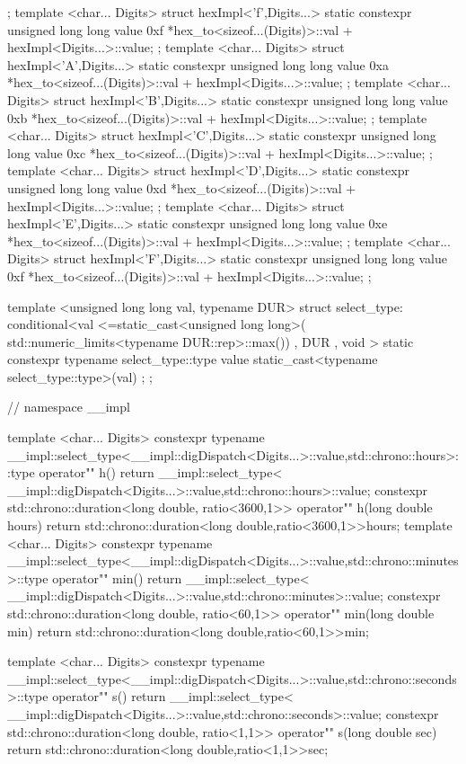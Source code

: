 \documentclass[ebook,11pt,article]{memoir}
\begin{document}
\begin{codeblock}
{{{{{};
template <char... Digits>
struct hexImpl<'f',Digits...>{
	static constexpr unsigned long long value{ 0xf *hex_to<sizeof...(Digits)>::val
						   + hexImpl<Digits...>::value};
};
template <char... Digits>
struct hexImpl<'A',Digits...>{
	static constexpr unsigned long long value{ 0xa *hex_to<sizeof...(Digits)>::val
						   + hexImpl<Digits...>::value};
};
template <char... Digits>
struct hexImpl<'B',Digits...>{
	static constexpr unsigned long long value{ 0xb *hex_to<sizeof...(Digits)>::val
						   + hexImpl<Digits...>::value};
};
template <char... Digits>
struct hexImpl<'C',Digits...>{
	static constexpr unsigned long long value{ 0xc *hex_to<sizeof...(Digits)>::val
						   + hexImpl<Digits...>::value};
};
template <char... Digits>
struct hexImpl<'D',Digits...>{
	static constexpr unsigned long long value{ 0xd *hex_to<sizeof...(Digits)>::val
						   + hexImpl<Digits...>::value};
};
template <char... Digits>
struct hexImpl<'E',Digits...>{
	static constexpr unsigned long long value{ 0xe *hex_to<sizeof...(Digits)>::val
						   + hexImpl<Digits...>::value};
};
template <char... Digits>
struct hexImpl<'F',Digits...>{
	static constexpr unsigned long long value{ 0xf *hex_to<sizeof...(Digits)>::val
						   + hexImpl<Digits...>::value};
};


template <unsigned long long val, typename DUR>
struct select_type:
	conditional<val <=static_cast<unsigned long long>(
			std::numeric_limits<typename DUR::rep>::max())
	, DUR
	, void > {
		static constexpr typename select_type::type
			value{ static_cast<typename select_type::type>(val) };
	};
} // namespace __impl

template <char... Digits>
constexpr typename 
__impl::select_type<__impl::digDispatch<Digits...>::value,std::chrono::hours>::type
operator"" h(){
	return  __impl::select_type<
	__impl::digDispatch<Digits...>::value,std::chrono::hours>::value;
}
constexpr std::chrono::duration<long double, ratio<3600,1>> operator"" h(long double hours){
	return std::chrono::duration<long double,ratio<3600,1>>{hours};
}
template <char... Digits>
constexpr typename 
__impl::select_type<__impl::digDispatch<Digits...>::value,std::chrono::minutes>::type
operator"" min(){
	return __impl::select_type<
	__impl::digDispatch<Digits...>::value,std::chrono::minutes>::value;
}
constexpr std::chrono::duration<long double, ratio<60,1>> operator"" min(long double min){
	return std::chrono::duration<long double,ratio<60,1>>{min};
}

template <char... Digits>
constexpr typename 
__impl::select_type<__impl::digDispatch<Digits...>::value,std::chrono::seconds>::type
operator"" s(){
	return __impl::select_type<
	__impl::digDispatch<Digits...>::value,std::chrono::seconds>::value;
}
constexpr std::chrono::duration<long double, ratio<1,1>> operator"" s(long double sec){
	return std::chrono::duration<long double,ratio<1,1>>{sec};
}

}}}
\end{codeblock}
\end{document}

